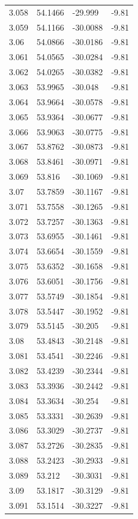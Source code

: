\begin{tabular}{llll}
3.058 & 54.1466 & -29.999 & -9.81 \\
3.059 & 54.1166 & -30.0088 & -9.81 \\
3.06 & 54.0866 & -30.0186 & -9.81 \\
3.061 & 54.0565 & -30.0284 & -9.81 \\
3.062 & 54.0265 & -30.0382 & -9.81 \\
3.063 & 53.9965 & -30.048 & -9.81 \\
3.064 & 53.9664 & -30.0578 & -9.81 \\
3.065 & 53.9364 & -30.0677 & -9.81 \\
3.066 & 53.9063 & -30.0775 & -9.81 \\
3.067 & 53.8762 & -30.0873 & -9.81 \\
3.068 & 53.8461 & -30.0971 & -9.81 \\
3.069 & 53.816 & -30.1069 & -9.81 \\
3.07 & 53.7859 & -30.1167 & -9.81 \\
3.071 & 53.7558 & -30.1265 & -9.81 \\
3.072 & 53.7257 & -30.1363 & -9.81 \\
3.073 & 53.6955 & -30.1461 & -9.81 \\
3.074 & 53.6654 & -30.1559 & -9.81 \\
3.075 & 53.6352 & -30.1658 & -9.81 \\
3.076 & 53.6051 & -30.1756 & -9.81 \\
3.077 & 53.5749 & -30.1854 & -9.81 \\
3.078 & 53.5447 & -30.1952 & -9.81 \\
3.079 & 53.5145 & -30.205 & -9.81 \\
3.08 & 53.4843 & -30.2148 & -9.81 \\
3.081 & 53.4541 & -30.2246 & -9.81 \\
3.082 & 53.4239 & -30.2344 & -9.81 \\
3.083 & 53.3936 & -30.2442 & -9.81 \\
3.084 & 53.3634 & -30.254 & -9.81 \\
3.085 & 53.3331 & -30.2639 & -9.81 \\
3.086 & 53.3029 & -30.2737 & -9.81 \\
3.087 & 53.2726 & -30.2835 & -9.81 \\
3.088 & 53.2423 & -30.2933 & -9.81 \\
3.089 & 53.212 & -30.3031 & -9.81 \\
3.09 & 53.1817 & -30.3129 & -9.81 \\
3.091 & 53.1514 & -30.3227 & -9.81 \\

\end{tabular}
